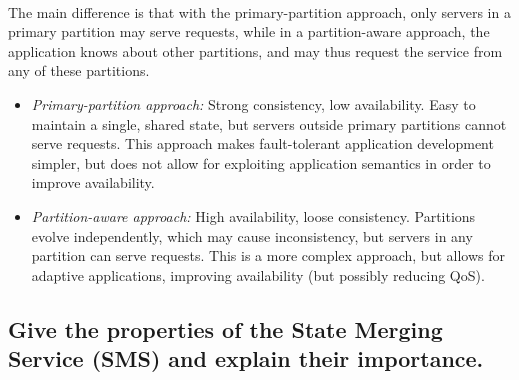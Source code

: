 \documentclass[a4paper,11pt]{article}
\begin{document}
\paragraph{}
The main difference is that with the primary-partition approach, only servers in a primary partition may serve requests, while in a partition-aware approach, the application knows about other partitions, and may thus request the service from any of these partitions.
\begin{itemize}
	\item \textit{Primary-partition approach:} Strong consistency, low availability. Easy to maintain a single, shared state, but servers outside primary partitions cannot serve requests. This approach makes fault-tolerant application development simpler, but does not allow for exploiting application semantics in order to improve availability.
	\item \textit{Partition-aware approach:} High availability, loose consistency. Partitions evolve independently, which may cause inconsistency, but servers in any partition can serve requests. This is a more complex approach, but allows for adaptive applications, improving availability (but possibly reducing QoS).
\end{itemize}

\subsection{
Give the properties of the State Merging Service (SMS) and explain their importance.
}
\end{document}
